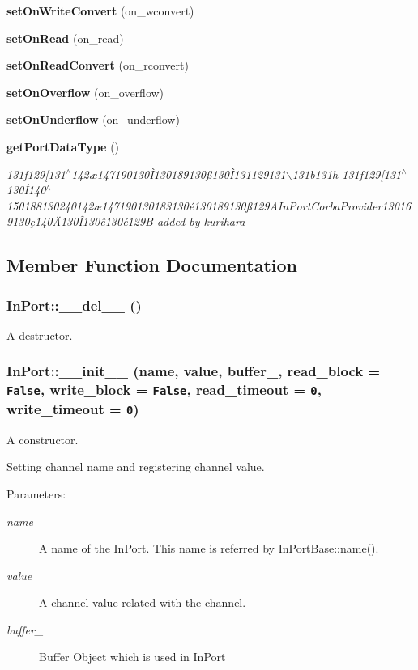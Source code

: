 \begin{CompactItemize}
{\bf set\-On\-Write\-Convert} (on\_\-wconvert)
\item 
{\bf set\-On\-Read} (on\_\-read)
\item 
{\bf set\-On\-Read\-Convert} (on\_\-rconvert)
\item 
{\bf set\-On\-Overflow} (on\_\-overflow)
\item 
{\bf set\-On\-Underflow} (on\_\-underflow)
\item 
{\bf get\-Port\-Data\-Type} ()
\begin{CompactList}\small\item\em 131f129[131$^\wedge$142\ae{}147190130\`{I}130189130\ss{}130\`{I}131129131$\backslash$131b131h 131f129[131$^\wedge$130\`{I}140$^\wedge$150188130240142\ae{}147190130183130\'{e}130189130\ss{}129AIn\-Port\-Corba\-Provider130169130\c{c}140\"{A}130\^{I}130\^{e}130\'{e}129B added by kurihara \item\end{CompactList}\end{CompactItemize}


\subsection{Member Function Documentation}
\subsubsection{\setlength{\rightskip}{0pt plus 5cm}In\-Port::\_\-\_\-del\_\-\_\- ()}\label{classInPort_InPorta1}


A destructor. 

\subsubsection{\setlength{\rightskip}{0pt plus 5cm}In\-Port::\_\-\_\-init\_\-\_\- (name, value, buffer\_\-, read\_\-block = {\tt False}, write\_\-block = {\tt False}, read\_\-timeout = {\tt 0}, write\_\-timeout = {\tt 0})}\label{classInPort_InPorta0}


A constructor. 

Setting channel name and registering channel value. \begin{Desc}
\item[Parameters:]
\begin{description}
\item[{\em name}]A name of the In\-Port. This name is referred by In\-Port\-Base::name(). \item[{\em value}]A channel value related with the channel. \item[{\em buffer\_\-}]Buffer Object which is used in In\-Port\end{description}
\end{Desc}
